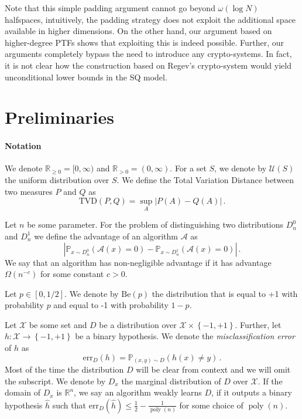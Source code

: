 \documentclass{theoretics}
\newcommand{\paren}[1]{(#1)}
\newcommand{\Paren}[1]{\left(#1\right)}
\newcommand{\Abs}[1]{\left\lvert#1\right\rvert}
\newcommand{\Set}[1]{\left\{#1\right\}}
\newcommand{\Psymb}{\mathbb{P}}
\DeclareMathOperator{\poly}{poly}
\newcommand{\R}{\mathbb R}
\newcommand{\cA}{\mathcal A}
\newcommand{\cU}{\mathcal U}
\newcommand{\cX}{\mathcal X}
\renewcommand{\leq}{\leqslant}
\renewcommand{\geq}{\geqslant}
\newcommand{\err}{\mathrm{err}}
\newcommand{\TVD}[2]{\mathrm{TVD}(#1,#2)}
\begin{document}
Note that this simple padding argument cannot go beyond $\omega(\log N)$ halfspaces, intuitively, the padding strategy does not exploit the additional space available in higher dimensions.
On the other hand, our argument based on higher-degree PTFs shows that exploiting this is indeed possible.
Further, our arguments completely bypass the need to introduce any crypto-systems.
In fact, it is not clear how the construction based on Regev's crypto-system would yield unconditional lower bounds in the SQ model.

\section{Preliminaries}
\label{sec:preliminaries}

\paragraph{Notation}
We denote $\R_{\geq 0} = [0,\infty)$ and $\R_{> 0} = (0,\infty)$.
For a set $S$, we denote by $\cU(S)$ the uniform distribution over $S$.
We define the Total Variation Distance between two measures $P$ and $Q$ as \[\TVD{P}{Q} = \sup_A \Abs{P(A) - Q(A)}\,.\]

Let $n$ be some parameter.
For the problem of distinguishing two distributions $D_n^{0}$ and $D_n^1$ we define the advantage of an algorithm $\cA$ as \[\Abs{\Psymb_{x \sim D_n^0} \Paren{\cA(x) = 0} - \Psymb_{x \sim D_n^1} \Paren{\cA(x) = 0}}\,.\]
We say that an algorithm has non-negligible advantage if it has advantage $\Omega(n^{-c})$ for some constant $c > 0$.

Let $p \in [0,1/2]$.
We denote by $\mathrm{Be}(p)$ the distribution that is equal to +1 with probability $p$ and equal to -1 with probability $1-p$.

Let $\cX$ be some set and $D$ be a distribution over $\cX \times \Set{-1,+1}$.
Further, let $h \colon \cX \rightarrow \Set{-1,+1}$ be a binary hypothesis.
We denote the \emph{misclassification error} of $h$ as \[\err_D \Paren{h} = \Psymb_{(x,y) \sim D}\Paren{h(x) \neq y} \,.\]
Most of the time the distribution $D$ will be clear from context and we will omit the subscript.
We denote by $D_x$ the marginal distribution of $D$ over $\cX$.
If the domain of $D_x$ is $\R^n$, we say an algorithm weakly learns $D$, if it outputs a binary hypothesis $\hat{h}$ such that $\err_D\paren{\hat{h}} \leq \tfrac 1 2 - \tfrac 1 {\poly(n)}$ for some choice of $\poly(n)$.
\end{document}

